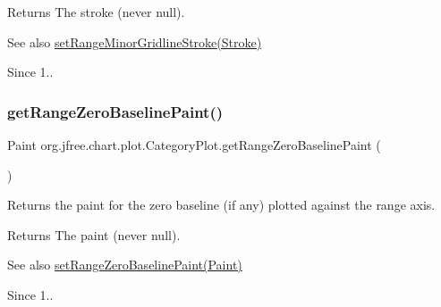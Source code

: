 \begin{DoxyReturn}{Returns}
The stroke (never {\ttfamily null}).
\end{DoxyReturn}
\begin{DoxySeeAlso}{See also}
\mbox{\hyperlink{classorg_1_1jfree_1_1chart_1_1plot_1_1_category_plot_a8ce4e87387bbf647f4c04f8d8c01998e}{set\+Range\+Minor\+Gridline\+Stroke(\+Stroke)}}
\end{DoxySeeAlso}
\begin{DoxySince}{Since}
1.. 
\end{DoxySince}
\mbox{\label{classorg_1_1jfree_1_1chart_1_1plot_1_1_category_plot_aa8276ead4325ef7f44f3d138bb8ef23e}} 
\subsubsection{\texorpdfstring{get\+Range\+Zero\+Baseline\+Paint()}{getRangeZeroBaselinePaint()}}
{\footnotesize\ttfamily Paint org.\+jfree.\+chart.\+plot.\+Category\+Plot.\+get\+Range\+Zero\+Baseline\+Paint (\begin{DoxyParamCaption}{ }\end{DoxyParamCaption})}

Returns the paint for the zero baseline (if any) plotted against the range axis.

\begin{DoxyReturn}{Returns}
The paint (never {\ttfamily null}).
\end{DoxyReturn}
\begin{DoxySeeAlso}{See also}
\mbox{\hyperlink{classorg_1_1jfree_1_1chart_1_1plot_1_1_category_plot_afd2285041f0d986fe129e3c00df3cfe8}{set\+Range\+Zero\+Baseline\+Paint(\+Paint)}}
\end{DoxySeeAlso}
\begin{DoxySince}{Since}
1.. 
\end{DoxySince}
\mbox{\label{classorg_1_1jfree_1_1chart_1_1plot_1_1_category_plot_a6f347b53454425e0038114bff25b9ece}} 
